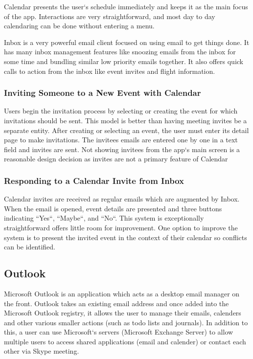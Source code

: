 \documentclass{sigchi}
\begin{document}
Calendar presents the user`s schedule immediately and keeps it as the main focus of the app.
Interactions are very straightforward, and most day to day calendaring can be done without entering a menu.

Inbox is a very powerful email client focused on using email to get things done.
It has many inbox management features like snoozing emails from the inbox for some time and bundling similar low priority emails together.
It also offers quick calls to action from the inbox like event invites and flight information.

\subsubsection{Inviting Someone to a New Event with Calendar}
Users begin the invitation process by selecting or creating the event for which invitations should be sent.
This model is better than having meeting invites be a separate entity.
After creating or selecting an event, the user must enter its detail page to make invitations.
The invitees emails are entered one by one in a text field and invites are sent.
Not showing invitees from the app`s main screen is a reasonable design decision as invites are not a primary feature of Calendar

\subsubsection{Responding to a Calendar Invite from Inbox}
Calendar invites are received as regular emails which are augmented by Inbox.
When the email is opened, event details are presented and three buttons indicating ``Yes``, ``Maybe``, and ``No``.
This system is exceptionally straightforward offers little room for improvement.
One option to improve the system is to present the invited event in the context of their calendar so conflicts can be identified.

\subsection{Outlook}

Microsoft Outlook is an application which acts as a desktop email manager on the front. 
Outlook takes an existing email address and once added into the Microsoft Outlook registry, it allows the user to manage their emails, calenders and other various smaller actions (such as todo lists and journals). 
In addition to this, a user can use Microsoft`s servers (Microsoft Exchange Server) to allow multiple users to access shared applications (email and calender) or contact each other via Skype meeting.
\end{document}
